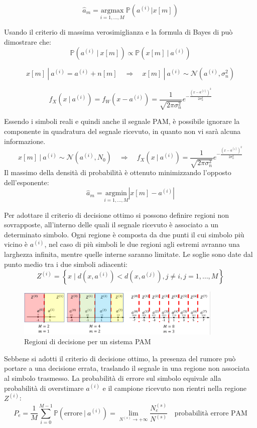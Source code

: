 \[
    \hat{a}_m = \underset{i=1,\ldots,M}{\mathrm{argmax}} \ \mathbb{P}(a^{(i)}|x[m])
\]

Usando il criterio di massima verosimiglianza e la formula di Bayes di può dimostrare che:
\[
    \mathbb{P}(a^{(i)} \ | \ x[m]) \propto  \mathbb{P}(x[m] \ | \ a^{(i)})
\]

\[
    x[m] \ | \ a^{(i)}  = a^{(i)} + n[m] \quad \Rightarrow \quad x[m] \ | \ a^{(i)} \sim \mathcal{N}(a^{(i)}, \sigma_n^2)
\]

\[
    f_X(x \ | \ a^{(i)}) = f_{W}(x - a^{(i)}) = \frac{1}{\sqrt{2\pi \sigma_n^2}} e^{-\frac{(x - a^{(i)})^2}{2\sigma_n^2}}
\]


Essendo i simboli reali e quindi anche il segnale PAM, è possibile ignorare la componente in quadratura del segnale ricevuto, in quanto non vi sarà alcuna informazione.
\[
    x[m] \ | \ a^{(i)} \sim \mathcal{N}(a^{(i)}, N_0) \quad \Rightarrow \quad f_X(x \ | \ a^{(i)}) = \frac{1}{\sqrt{2\pi \sigma_n^2}} e^{-\frac{(x - a^{(i)})^2}{2\sigma_n^2}}
\]
Il massimo della densità di probabilità è ottenuto minimizzando l'opposto dell'esponente:
\[
    \hat{a}_m = \underset{i=1,\ldots,M}{\mathrm{argmin}} \left| x[m] - a^{(i)} \right| 
\]

Per adottare il criterio di decisione ottimo si possono definire regioni non sovrapposte, all'interno delle quali il segnale ricevuto è associato a un determinato simbolo.
Ogni regione è composta da due punti il cui simbolo più vicino è $a^{(i)}$, nel caso di più simboli le due regioni agli estremi avranno una larghezza infinita, mentre quelle interne saranno limitate.
Le soglie sono date dal punto medio tra i due simboli adiacenti:
\[
    Z^{(i)} = \left\{ x \mid d(x, a^{(i)}) < d(x, a^{(j)}), j \neq i, j = 1, \ldots, M \right\}
\]


\begin{figure}[ht]
    \centering
    \includegraphics[width=0.875\textwidth]{imgs/regions.png}
    \caption*{Regioni di decisione per un sistema PAM}
\end{figure}





Sebbene si adotti il criterio di decisione ottimo, la presenza del rumore può portare a una decisione errata, traslando il segnale in una regione non associata al simbolo trasmesso.
La probabilità di errore sul simbolo equivale alla probabilità di overstimare $a^{(i)}$ e il campione ricevuto non rientri nella regione $Z^{(i)}$:
\[
    P_e = \frac{1}{M} \sum_{i=0}^{M-1} \mathbb{P}(\text{errore} \ | \ a^{(i)}) = \lim_{N^{(s)} \to +\infty} \frac{N_e^{(s)}}{N^{(s)}} \quad \text{probabilità errore PAM}
\]


